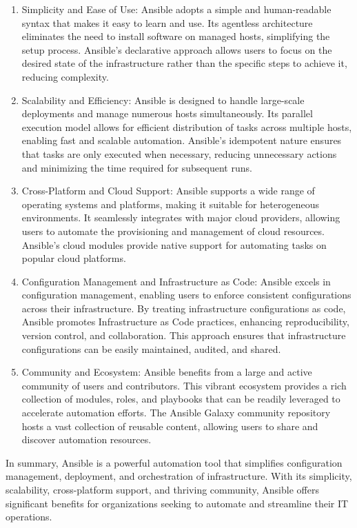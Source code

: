 \begin{enumerate}
    \item Simplicity and Ease of Use: Ansible adopts a simple and human-readable syntax that makes it easy to learn and use. Its agentless architecture eliminates the need to install software on managed hosts, simplifying the setup process. Ansible's declarative approach allows users to focus on the desired state of the infrastructure rather than the specific steps to achieve it, reducing complexity.

    \item Scalability and Efficiency: Ansible is designed to handle large-scale deployments and manage numerous hosts simultaneously. Its parallel execution model allows for efficient distribution of tasks across multiple hosts, enabling fast and scalable automation. Ansible's idempotent nature ensures that tasks are only executed when necessary, reducing unnecessary actions and minimizing the time required for subsequent runs.

    \item Cross-Platform and Cloud Support: Ansible supports a wide range of operating systems and platforms, making it suitable for heterogeneous environments. It seamlessly integrates with major cloud providers, allowing users to automate the provisioning and management of cloud resources. Ansible's cloud modules provide native support for automating tasks on popular cloud platforms.

    \item Configuration Management and Infrastructure as Code: Ansible excels in configuration management, enabling users to enforce consistent configurations across their infrastructure. By treating infrastructure configurations as code, Ansible promotes Infrastructure as Code practices, enhancing reproducibility, version control, and collaboration. This approach ensures that infrastructure configurations can be easily maintained, audited, and shared.

    \item Community and Ecosystem: Ansible benefits from a large and active community of users and contributors. This vibrant ecosystem provides a rich collection of modules, roles, and playbooks that can be readily leveraged to accelerate automation efforts. The Ansible Galaxy community repository hosts a vast collection of reusable content, allowing users to share and discover automation resources.

\end{enumerate}

In summary, Ansible is a powerful automation tool that simplifies configuration management, deployment, and orchestration of infrastructure. With its simplicity, scalability, cross-platform support, and thriving community, Ansible offers significant benefits for organizations seeking to automate and streamline their IT operations.
